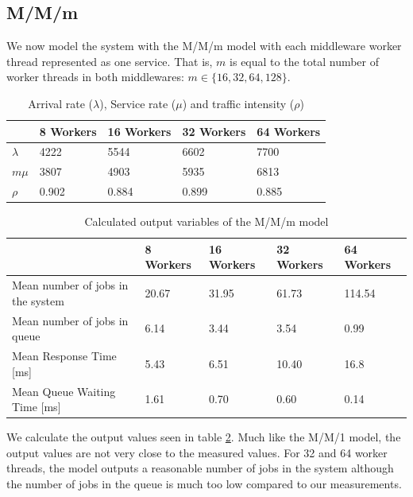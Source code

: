 \documentclass[11pt,a4paper]{article}
\begin{document}
\subsection{M/M/m}

We now model the system with the M/M/m model with each middleware worker thread represented as one service. That is, $m$ is equal to the total number of worker threads in both middlewares: $m \in \{16, 32, 64, 128\}$.

\begin{table}[h]
\centering
\caption{Arrival rate ($\lambda$), Service rate ($\mu$) and traffic intensity ($\rho$)}
\label{table:mmminput}
\begin{tabular}{l|llll}
          & 8 Workers & 16 Workers & 32 Workers & 64 Workers \\ \hline
$\lambda$ & 4222      & 5544       & 6602       & 7700       \\
$m\mu$     & 3807    & 4903     & 5935     & 6813    \\
$\rho$    & 0.902     & 0.884      & 0.899      & 0.885     
\end{tabular}
\end{table}


\begin{table}[h]
\centering
\caption{Calculated output variables of the M/M/m model}
\label{table:mmmoutput}
\begin{tabular}{l|llll}
                                  & 8 Workers & 16 Workers & 32 Workers & 64 Workers \\ \hline
Mean number of jobs in the system & 20.67     & 31.95      & 61.73      & 114.54     \\
Mean number of jobs in queue      & 6.14      & 3.44       & 3.54       & 0.99       \\
Mean Response Time {[}ms{]}       & 5.43      & 6.51       & 10.40      & 16.8       \\
Mean Queue Waiting Time {[}ms{]}        & 1.61      & 0.70       & 0.60       & 0.14      
\end{tabular}
\end{table}

We calculate the output values seen in table \ref{table:mmmoutput}. Much like the M/M/1 model, the output values are not very close to the measured values. For 32 and 64 worker threads, the model outputs a reasonable number of jobs in the system although the number of jobs in the queue is much too low compared to our measurements. \\
\end{document}
